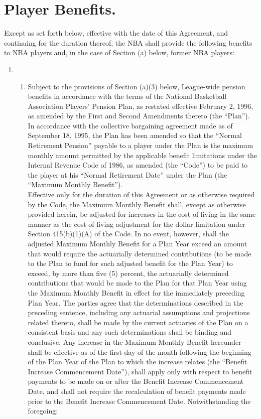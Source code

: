 \documentclass[
]{book}
\providecommand{\tightlist}{%
  \setlength{\itemsep}{0pt}\setlength{\parskip}{0pt}}
\begin{document}
\hypertarget{player-benefits.}{%
\section{Player Benefits.}\label{player-benefits.}}

Except as set forth below, effective with the date of this Agreement, and continuing for the duration thereof, the NBA shall provide the following benefits to NBA players and, in the case of Section (a) below, former NBA players:

\begin{enumerate}
\def\labelenumi{(\alph{enumi})}
\item
  \begin{enumerate}
  \def\labelenumii{(\arabic{enumii})}
  \tightlist
  \item
    Subject to the provisions of Section (a)(3) below, League-wide pension benefits in accordance with the terms of the National Basketball Association Players' Pension Plan, as restated effective February 2, 1996, as amended by the First and Second Amendments thereto (the ``Plan''). In accordance with the collective bargaining agreement made as of September 18, 1995, the Plan has been amended so that the ``Normal Retirement Pension'' payable to a player under the Plan is the maximum monthly amount permitted by the applicable benefit limitations under the Internal Revenue Code of 1986, as amended (the ``Code'') to be paid to the player at his ``Normal Retirement Date'' under the Plan (the ``Maximum Monthly Benefit'').\\
    Effective only for the duration of this Agreement or as otherwise required by the Code, the Maximum Monthly Benefit shall, except as otherwise provided herein, be adjusted for increases in the cost of living in the same manner as the cost of living adjustment for the dollar limitation under Section 415(b)(1)(A) of the Code. In no event, however, shall the adjusted Maximum Monthly Benefit for a Plan Year exceed an amount that would require the actuarially determined contributions (to be made to the Plan to fund for such adjusted benefit for the Plan Year) to exceed, by more than five (5) percent, the actuarially determined contributions that would be made to the Plan for that Plan Year using the Maximum Monthly Benefit in effect for the immediately preceding Plan Year. The parties agree that the determinations described in the preceding sentence, including any actuarial assumptions and projections related thereto, shall be made by the current actuaries of the Plan on a consistent basis and any such determinations shall be binding and conclusive. Any increase in the Maximum Monthly Benefit hereunder shall be effective as of the first day of the month following the beginning of the Plan Year of the Plan to which the increase relates (the ``Benefit Increase Commencement Date''), shall apply only with respect to benefit payments to be made on or after the Benefit Increase Commencement Date, and shall not require the recalculation of benefit payments made prior to the Benefit Increase Commencement Date. Notwithstanding the foregoing:


\end{enumerate}
\end{enumerate}
\end{document}
